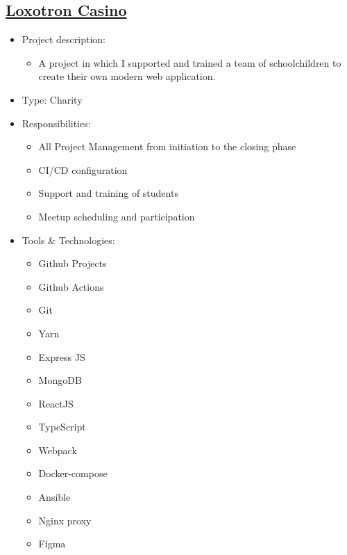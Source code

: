 \hypertarget{proj_loxotron}{\subsection{\href{https://github.com/dkushche/Loxotron}{Loxotron Casino}}}
\begin{itemize}
    \item Project description:
    \begin{itemize}
        \item A project in which I supported and trained a team of schoolchildren to create their
              own modern web application.
    \end{itemize}
    \item Type: Charity
    \item Responsibilities:
    \begin{itemize}
        \item All Project Management from initiation to the closing phase
        \item CI/CD configuration
        \item Support and training of students
        \item Meetup scheduling and participation
    \end{itemize}
    \item Tools \& Technologies:
    \begin{itemize}
        \item Github Projects
        \item Github Actions
        \item Git
        \item Yarn
        \item Express JS
        \item MongoDB
        \item ReactJS
        \item TypeScript
        \item Webpack
        \item Docker-compose
        \item Ansible
        \item Nginx proxy
        \item Figma
    \end{itemize}
\end{itemize}
\newpage

